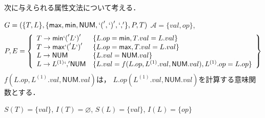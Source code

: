 \documentclass[dvipdfmx,a4j]{jbook}
\begin{document}
\begin{Exmp}
    次に与えられる属性文法について考える．

    $G=(\{T,L\},\{\mathsf{max},\mathsf{min},\mathsf{NUM},`{\tt (}',`{\tt )}',`{\tt ,}'\},P,T)$ $\mathcal{A}=\{val,op\}$,
    \[P,E=\left\{\begin{array}{ll}
            T\rightarrow\mathsf{min}`{\tt (}' L`{\tt )}'
             & \{L.op=\mathsf{min},T.val=L.val\}                              \\
            T\rightarrow\mathsf{max}`{\tt (}' L `{\tt )}'
             & \{L.op=\mathsf{max},T.val=L.val\}                              \\
            L\rightarrow\mathsf{NUM}
             & \{L.val=\mathsf{NUM}.val\}                                     \\
            L\rightarrow L^{(1)} `{\tt ,}' \mathsf{NUM}
             & \{L.val=f(L.op,L^{(1)}.val,\mathsf{NUM}.val),L^{(1)}.op=L.op\}
        \end{array}\right\}\]
    $f(L.op,L^{(1)}.val,\mathsf{NUM}.val)$は，
    $L.op(L^{(1)}.val,\mathsf{NUM}.val)$を計算する意味関数とする．

    $S(T)=\{val\}$, $I(T)=\varnothing$, $S(L)=\{val\}$, $I(L)=\{op\}$


\end{Exmp}
\end{document}

